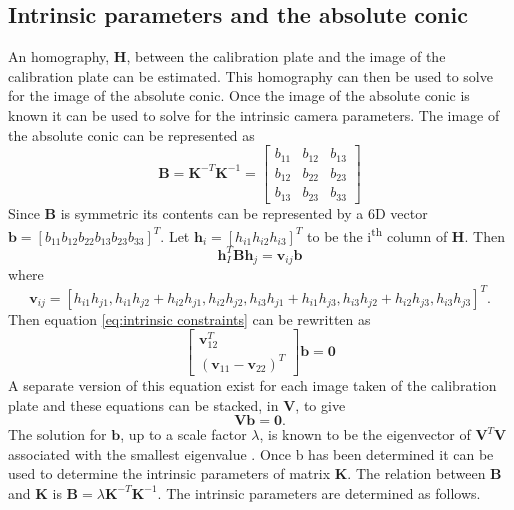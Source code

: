 \subsection{Intrinsic parameters and the absolute conic}
\label{sec: parameters and the absolute conic}
An homography, $\bm{H}$, between the calibration plate and the image of the calibration plate can be estimated. This homography can then be used to solve for the image of the absolute conic. Once the image of the absolute conic is known it can be used to solve for the intrinsic camera parameters. The image of the absolute conic can be represented as
\begin{equation}
	\bm{B} = \bm{K}^{-T} \bm{K}^{-1} = 
	\begin{bmatrix}
	b_{11} & b_{12} & b_{13}\\
	b_{12} & b_{22} & b_{23} \\
	b_{13} & b_{23} & b_{33}
	\end{bmatrix}
\end{equation}
Since $\bm{B}$ is symmetric its contents can be represented by a 6D vector $\bm{b}=[b_{11} b_{12} b_{22} b_{13} b_{23} b_{33}]^T$. Let $\bm{h}_i = [h_{i1} h_{i2} h_{i3}]^T$ to be the i\textsuperscript{th} column of $\bm{H}$. Then
\begin{equation}
	\bm{h}_I^T \bm{B} \bm{h}_j = \bm{v}_{ij} \bm{b}
\end{equation}
where 
\begin{equation}
	\bm{v}_{ij} = [ h_{i1} h_{j1}, h_{i1} h_{j2} + h_{i2} h_{j1}, h_{i2} h_{j2}, h_{i3} h_{j1} + h_{i1} h_{j3}, h_{i3} h_{j2} + h_{i2} h_{j3}, h_{i3} h_{j3}]^T.
\end{equation}
Then equation \ref{eq:intrinsic constraints} can be rewritten as 
\begin{equation}
	\begin{bmatrix} 
	\bm{v}_{12}^T \\
	( \bm{v}_{11} - \bm{v}_{22})^T
	\end{bmatrix} \bm{b} = \bm{0}
\end{equation}
A separate version of this equation exist for each image taken of the calibration plate and these equations can be stacked, in $\bm{V}$, to give
\begin{equation}
	\bm{V}\bm{b}=\bm{0}.
\end{equation}
The solution for $\bm{b}$, up to a scale factor $\lambda$, is known to be the eigenvector of $\bm{V}^T\bm{V}$ associated with the smallest eigenvalue \cite{emerging}. Once b has been determined it can be used to determine the intrinsic parameters of matrix $\bm{K}$. The relation between $\bm{B}$ and $\bm{K}$ is $\bm{B}=\lambda \bm{K}^{-T} \bm{K}^{-1}$. The intrinsic parameters are determined as follows.
